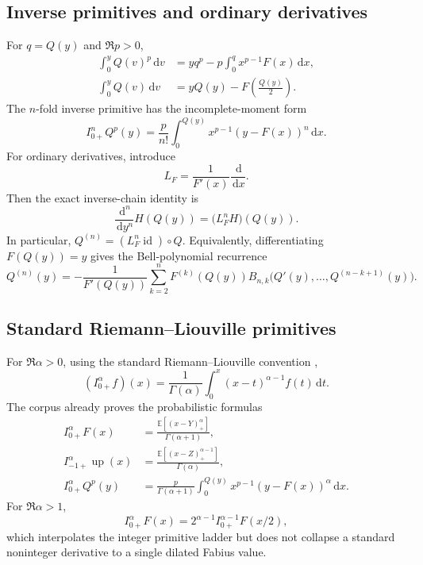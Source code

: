 \documentclass[11pt,oneside]{article}
\numberwithin{equation}{section}
\theoremstyle{plain}
\theoremstyle{definition}
\theoremstyle{remark}
\newcommand{\E}{\mathbb E}
\newcommand{\Up}{\operatorname{up}}
\newcommand{\dd}{\,\mathrm d}
\begin{document}
\subsection{Inverse primitives and ordinary derivatives}

For $q=Q(y)$ and $\Re p>0$,
\begin{align}
 \int_0^yQ(v)^p\dd v
 &=yq^p-p\int_0^qx^{p-1}F(x)\dd x,
 \label{eq:Q-power-primitive}\\
 \int_0^yQ(v)\dd v
 &=yQ(y)-F\!\left(\frac{Q(y)}2\right).
 \label{eq:Q-first-primitive}
\end{align}
The $n$-fold inverse primitive has the incomplete-moment form
\begin{equation}
 I_{0+}^nQ^p(y)
 =\frac{p}{n!}\int_0^{Q(y)}x^{p-1}(y-F(x))^n\dd x.
 \label{eq:Q-n-primitive}
\end{equation}
For ordinary derivatives, introduce
\begin{equation}
 L_F=\frac1{F'(x)}\frac{\dd}{\dd x}.
 \label{eq:LF}
\end{equation}
Then the exact inverse-chain identity is
\begin{equation}
 \frac{\dd^n}{\dd y^n}H(Q(y))
 =\bigl(L_F^nH\bigr)(Q(y)).
 \label{eq:inverse-chain}
\end{equation}
In particular, $Q^{(n)}=(L_F^n\operatorname{id})\circ Q$.  Equivalently,
differentiating $F(Q(y))=y$ gives the Bell-polynomial recurrence
\begin{equation}
 Q^{(n)}(y)
 =-\frac1{F'(Q(y))}
 \sum_{k=2}^nF^{(k)}(Q(y))
 B_{n,k}\bigl(Q'(y),\ldots,Q^{(n-k+1)}(y)\bigr).
 \label{eq:Q-Bell}
\end{equation}

\subsection{Standard Riemann--Liouville primitives}

For $\Re\alpha>0$, using the standard Riemann--Liouville convention
\cite{Samko,Podlubny},
\begin{equation}
 (I_{0+}^\alpha f)(x)
 =\frac1{\Gamma(\alpha)}\int_0^x(x-t)^{\alpha-1}f(t)\dd t.
 \label{eq:RL-def}
\end{equation}
The corpus already proves the probabilistic formulas
\begin{align}
 I_{0+}^\alpha F(x)
 &=\frac{\E[(x-Y)_+^\alpha]}{\Gamma(\alpha+1)},
 \label{eq:RL-F-prob}\\
 I_{-1+}^\alpha\Up(x)
 &=\frac{\E[(x-Z)_+^{\alpha-1}]}{\Gamma(\alpha)},
 \label{eq:RL-up-prob}\\
 I_{0+}^\alpha Q^p(y)
 &=\frac{p}{\Gamma(\alpha+1)}
   \int_0^{Q(y)}x^{p-1}(y-F(x))^\alpha\dd x.
 \label{eq:RL-Qp-baseline}
\end{align}
For $\Re\alpha>1$,
\begin{equation}
 I_{0+}^\alpha F(x)
 =2^{\alpha-1}I_{0+}^{\alpha-1}F(x/2),
 \label{eq:RL-dyadic-recurrence}
\end{equation}
which interpolates the integer primitive ladder but does not collapse a
standard noninteger derivative to a single dilated Fabius value.
\end{document}
